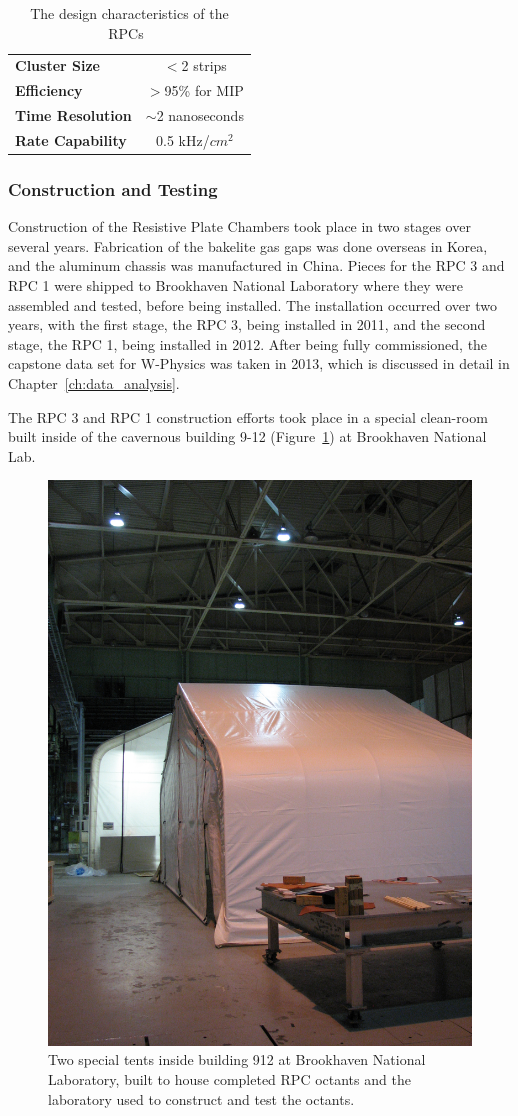 \begin{table}[ht]
  \centering
  \begin{tabular}{lc}
    \toprule 
    \textbf{Cluster Size} & $<$2 strips \\
    \textbf{Efficiency} & $>$95\% for MIP \\
    \textbf{Time Resolution} & $\sim$2 nanoseconds \\
    \textbf{Rate Capability} & 0.5 kHz/$cm^2$ \\
    \bottomrule
  \end{tabular}
  \caption{
    The design characteristics of the RPCs~\cite{Fukao2011}
  }
  \label{tab:rpc_design_characteristics}
\end{table}

\subsubsection{Construction and Testing}

Construction of the Resistive Plate Chambers took place in two stages over
several years. Fabrication of the bakelite gas gaps was done overseas in Korea,
and the aluminum chassis was manufactured in China. Pieces for the RPC 3 and RPC
1 were shipped to Brookhaven National Laboratory where they were assembled and
tested, before being installed. The installation occurred over two years, with
the first stage, the RPC 3, being installed in 2011, and the second stage, the
RPC 1, being installed in 2012. After being fully commissioned, the capstone
data set for W-Physics was taken in 2013, which is discussed in detail in
Chapter~\ref{ch:data_analysis}.

The RPC 3 and RPC 1 construction efforts took place in a special clean-room
built inside of the cavernous building 9-12 (Figure~\ref{fig:building_912}) at
Brookhaven National Lab. 

\begin{figure}
  \centering
  \includegraphics[width=0.5\linewidth]{./figures/building_912_rpc_tent.jpg}
  \caption{
    Two special tents inside building 912 at Brookhaven National Laboratory,
    built to house completed RPC octants and the laboratory used to construct
    and test the octants. 
  }
  \label{fig:building_912}
\end{figure}

